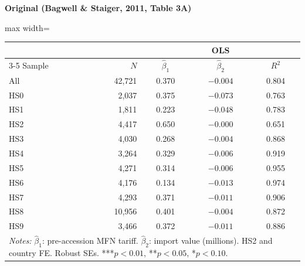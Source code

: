 \documentclass[11pt,a4paper]{article}
\begin{document}
\vspace{0.5cm}
\begin{minipage}[t]{0.48\textwidth}
\centering
\textbf{\large Original (Bagwell \& Staiger, 2011, Table 3A)}
\vspace{0.3cm}

\begin{adjustbox}{max width=\textwidth}
\begin{tabular}{lrccc}
\toprule
& & \multicolumn{3}{c}{OLS} \\
\cmidrule(lr){3-5}
Sample & $N$ & $\hat{\beta}_1$ & $\hat{\beta}_2$ & $R^2$ \\
\midrule
All    & 42,721 & 0.370 & $-0.004$ & 0.804 \\
HS0    &  2,037 & 0.375 & $-0.073$ & 0.763 \\
HS1    &  1,811 & 0.223 & $-0.048$ & 0.783 \\
HS2    &  4,417 & 0.650 & $-0.000$ & 0.651 \\
HS3    &  4,030 & 0.268 & $-0.004$ & 0.868 \\
HS4    &  3,264 & 0.329 & $-0.006$ & 0.919 \\
HS5    &  4,271 & 0.314 & $-0.006$ & 0.955 \\
HS6    &  4,176 & 0.134 & $-0.013$ & 0.974 \\
HS7    &  4,293 & 0.371 & $-0.011$ & 0.906 \\
HS8    & 10,956 & 0.401 & $-0.004$ & 0.872 \\
HS9    &  3,466 & 0.372 & $-0.011$ & 0.886 \\
\bottomrule
\multicolumn{5}{p{0.95\textwidth}}{\footnotesize\textit{Notes:} $\hat{\beta}_1$: pre-accession MFN tariff. $\hat{\beta}_2$: import value (millions). HS2 and country FE. Robust SEs. ***$p<0.01$, **$p<0.05$, *$p<0.10$.}
\end{tabular}
\end{adjustbox}
\end{minipage}%
\hfill
\end{document}
